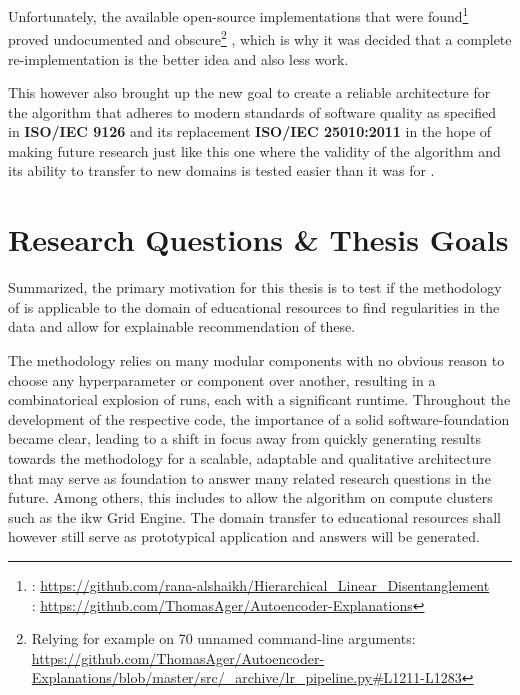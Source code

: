 Unfortunately, the available open-source implementations that were found\footnote{\cite{Alshaikh2020}: \url{https://github.com/rana-alshaikh/Hierarchical_Linear_Disentanglement}\\ \indent {} \cite{Ager2018}: \url{https://github.com/ThomasAger/Autoencoder-Explanations}} proved undocumented and obscure\footnote{Relying for example on 70 unnamed command-line arguments: \url{https://github.com/ThomasAger/Autoencoder-Explanations/blob/master/src/_archive/lr_pipeline.py\#L1211-L1283}}
, which is why it was decided that a complete re-implementation is the better idea and also less work. 

This however also brought up the new goal to create a reliable architecture for the algorithm that adheres to modern standards of software quality as specified in \textbf{ISO/IEC 9126} and its replacement \textbf{ISO/IEC 25010:2011} in the hope of making future research just like this one where the validity of the algorithm and its ability to transfer to new domains is tested easier than it was for \me.



\section{Research Questions \& Thesis Goals}
\label{sec:goals_research_questions}

Summarized, the primary motivation for this thesis is to test if the methodology of \textcite{Derrac2015} is applicable to the domain of educational resources to find regularities in the data and allow for explainable recommendation of these. 

The methodology relies on many modular components with no obvious reason to choose any hyperparameter or component over another, resulting in a combinatorical explosion of runs, each with a significant runtime. Throughout the development of the respective code, the importance of a solid software-foundation became clear, leading to a shift in focus away from quickly generating results towards the methodology for a scalable, adaptable and qualitative architecture that may serve as foundation to answer many related research questions in the future. Among others, this includes to allow the algorithm on compute clusters such as the \gls{ikw} Grid Engine. The domain transfer to educational resources shall however still serve as prototypical application and answers will be generated.

